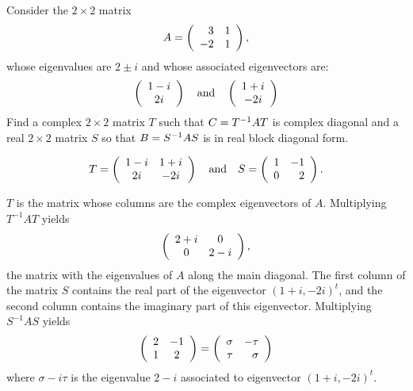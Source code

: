 \documentclass{ximera}
\begin{document}
\begin{exercise}  \label{c10.4.3}
Consider the $2\times 2$ matrix 
\[
A = \left(\begin{array}{rr} 3 & 1\\ -2 &1\end{array}\right),
\]
whose eigenvalues are $2\pm i$ and whose associated eigenvectors are:
\[
\left(\begin{array}{c} 1-i \\ 2i\end{array}\right) \quad\mbox{and}\quad \left(\begin{array}{c} 1+i \\ -2i\end{array}\right)
\]
Find a complex $2\times 2$ matrix $T$ such that $C=T^{-1} AT$ is complex
diagonal and a real $2\times 2$ matrix $S$ so that $B=S^{-1} AS$ is in real
block diagonal form.

\begin{solution}

\ans
\[
T = \left(\begin{array}{cc} 1 - i & 1 + i\\ 2i &-2i\end{array}\right)
\quad\mbox{and}\quad S = \left(\begin{array}{rr} 1 & -1\\ 0 &2\end{array}\right).
\]

\soln $T$ is the matrix whose columns are the complex eigenvectors
of $A$.  Multiplying $T^{-1}AT$ yields
\[
\left(\begin{array}{cc} 2 + i & 0\\ 0 &2 - i\end{array}\right),
\]
the matrix with the eigenvalues of $A$ along the main diagonal.  The
first column of the matrix $S$ contains the real part of the eigenvector
$(1 + i, -2i)^t$, and the second column contains the imaginary part of
this eigenvector. Multiplying $S^{-1}AS$ yields
\[
\left(\begin{array}{cc} 2 & -1\\ 1 &2\end{array}\right) = \left(\begin{array}{rr} \sigma & -\tau\\ \tau &\sigma\end{array}\right)
\]
where $\sigma - i\tau$ is the eigenvalue $2 - i$ associated to
eigenvector $(1 + i, -2i)^t$.

\end{solution}
\end{exercise}
\end{document}
